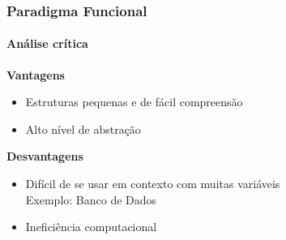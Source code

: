 \begin{frame}
    \frametitle{Paradigma Funcional}
    \framesubtitle{Análise crítica}

    \pause

    \textbf{Vantagens} 
    \begin{itemize}
      \item Estruturas pequenas e de fácil compreensão \pause 
      \item Alto nível de abstração \pause 
    \end{itemize}

    \textbf{Desvantagens} 
    \begin{itemize}
      \item Difícil de se usar em contexto com muitas variáveis
      \\ Exemplo: Banco de Dados \pause  
      \item Ineficiência computacional 
    \end{itemize}
     
\end{frame}


\nocite{haskellslides}
\nocite{funcoespura}
\nocite{funcoespura2}
\nocite{haskellwikipedia}
\nocite{paradigmas}